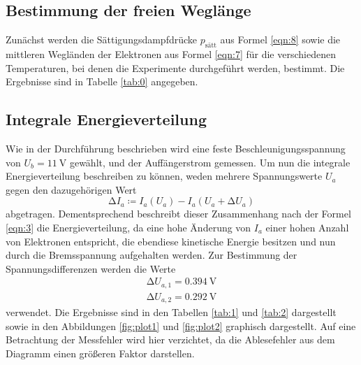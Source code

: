 
\subsection{Bestimmung der freien Weglänge}
Zunächst werden die Sättigungsdampfdrücke $p_{\text{sätt}}$ aus Formel \eqref{eqn:8} sowie die mittleren Wegländen der Elektronen aus Formel \eqref{eqn:7} für die verschiedenen Temperaturen, bei denen die Experimente durchgeführt werden, bestimmt.
Die Ergebnisse sind in Tabelle \ref{tab:0} angegeben.


\subsection{Integrale Energieverteilung}
Wie in der Durchführung beschrieben wird eine feste Beschleunigungsspannung von $U_b = \SI{11}{\volt}$ gewählt, und der Auffängerstrom gemessen.
Um nun die integrale Energieverteilung beschreiben zu können, weden mehrere Spannungswerte $U_a$ gegen den dazugehörigen Wert
\begin{equation}
  \increment I_a \coloneq I_a(U_a) - I_a(U_a + \increment U_a)
\end{equation}
abgetragen.
Dementsprechend beschreibt dieser Zusammenhang nach der Formel \eqref{eqn:3} die Energieverteilung, da eine hohe Änderung von $I_a$ einer hohen Anzahl von Elektronen entspricht, die ebendiese kinetische Energie besitzen und nun durch die Bremsspannung aufgehalten werden.
Zur Bestimmung der Spannungsdifferenzen werden die Werte
\begin{align*}
  \increment U_{a,1} = \SI{0,394}{\volt} \\
  \increment U_{a,2} = \SI{0.292}{\volt}
\end{align*}
verwendet.
Die Ergebnisse sind in den Tabellen \ref{tab:1} und \ref{tab:2} dargestellt sowie in den Abbildungen \ref{fig:plot1} und \ref{fig:plot2} graphisch dargestellt.
Auf eine Betrachtung der Messfehler wird hier verzichtet, da die Ablesefehler aus dem Diagramm einen größeren Faktor darstellen.

